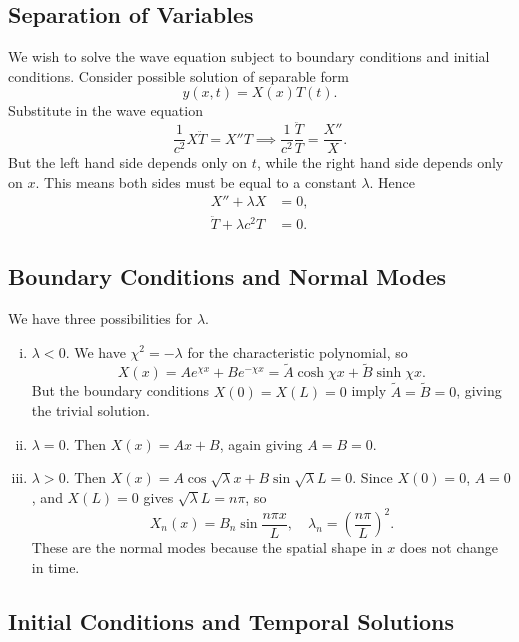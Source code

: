 \documentclass[12pt]{article}
\theoremstyle{definition}
\theoremstyle{remark}
\begin{document}
\subsection{Separation of Variables}%
\label{sub:separation_of_variables}

We wish to solve the wave equation subject to boundary conditions and initial conditions. Consider possible solution of separable form
\[
	y(x, t) = X(x) T(t)
.\]
Substitute in the wave equation
\[
\frac{1}{c^2} X \ddot T = X'' T \implies \frac{1}{c^2} \frac{\ddot T}{T} = \frac{X''}{X}
.\]
But the left hand side depends only on $t$, while the right hand side depends only on $x$. This means both sides must be equal to a constant $\lambda$. Hence
\begin{align*}
	X'' + \lambda X &= 0, \\
	\ddot T + \lambda c^2 T &= 0.
\end{align*}

\subsection{Boundary Conditions and Normal Modes}%
\label{sub:boundary_conditions_and_normal_modes}

We have three possibilities for $\lambda$.
\begin{enumerate}[(i)]
	\item $\lambda < 0$. We have $\chi^2 = - \lambda$ for the characteristic polynomial, so
		\[
			X(x) = A e^{\chi x} + Be^{-\chi x} = \tilde A \cosh \chi x + \tilde B \sinh \chi x
		.\]
		But the boundary conditions $X(0) = X(L) = 0$ imply $\tilde A = \tilde B = 0$, giving the trivial solution.
	\item $\lambda = 0$. Then $X(x) = Ax + B$, again giving $A = B = 0$.
	\item $\lambda > 0$. Then $X(x) = A \cos \sqrt \lambda x + B \sin \sqrt \lambda L = 0$. Since $X(0) = 0$, $A = 0$, and $X(L) = 0$ gives $\sqrt \lambda L = n \pi$, so
		\[
			X_n(x) = B_n \sin \frac{n \pi x}{L}, \quad \lambda_n = \left( \frac{n \pi}{L}\right)^2
		.\]
		These are the normal modes because the spatial shape in $x$ does not change in time.
\end{enumerate}

\subsection{Initial Conditions and Temporal Solutions}%
\label{sub:initial_conditions_and_temporal_solutions}
\end{document}
